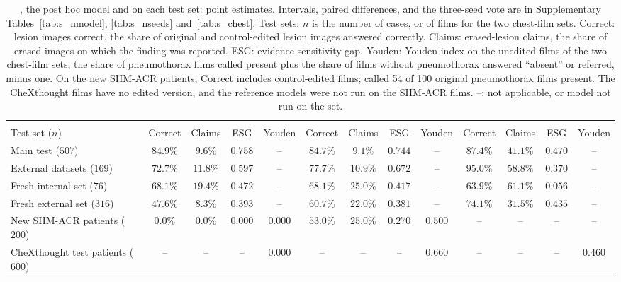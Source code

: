 \begin{table}[!t]
\caption{\ms{}, the post hoc model \msn{} and \gem{} on each test set: point estimates. Intervals, paired differences, \msp{} and the three-seed vote are in Supplementary Tables~\ref{tab:s_nmodel}, \ref{tab:s_nseeds} and~\ref{tab:s_chest}. Test sets: $n$ is the number of cases, or of films for the two chest-film sets. Correct: lesion images correct, the share of original and control-edited lesion images answered correctly. Claims: erased-lesion claims, the share of erased images on which the finding was reported. ESG: evidence sensitivity gap. Youden: Youden index on the unedited films of the two chest-film sets, the share of pneumothorax films called present plus the share of films without pneumothorax answered ``absent'' or referred, minus one. On the new SIIM-ACR patients, Correct includes control-edited films; \msn{} called 54 of 100 original pneumothorax films present. The CheXthought films have no edited version, and the reference models were not run on the SIIM-ACR films. --: not applicable, or model not run on the set.}
\label{tab:nmodel}
\centering
\footnotesize
\setlength{\tabcolsep}{3.5pt}
\begin{adjustbox}{max width=\textwidth}
\begin{tabular}{l cccc cccc cccc}
\toprule
 & \multicolumn{4}{c}{\ms{}} & \multicolumn{4}{c}{\msn{}} & \multicolumn{4}{c}{\gem{}} \\
\cmidrule(lr){2-5}\cmidrule(lr){6-9}\cmidrule(lr){10-13}
Test set ($n$) & Correct & Claims & ESG & Youden & Correct & Claims & ESG & Youden & Correct & Claims & ESG & Youden \\
\midrule
Main test ($507$) & $84.9\%$ & $9.6\%$ & $0.758$ & -- & $84.7\%$ & $9.1\%$ & $0.744$ & -- & $87.4\%$ & $41.1\%$ & $0.470$ & -- \\
External datasets ($169$) & $72.7\%$ & $11.8\%$ & $0.597$ & -- & $77.7\%$ & $10.9\%$ & $0.672$ & -- & $95.0\%$ & $58.8\%$ & $0.370$ & -- \\
Fresh internal set ($76$) & $68.1\%$ & $19.4\%$ & $0.472$ & -- & $68.1\%$ & $25.0\%$ & $0.417$ & -- & $63.9\%$ & $61.1\%$ & $0.056$ & -- \\
Fresh external set ($316$) & $47.6\%$ & $8.3\%$ & $0.393$ & -- & $60.7\%$ & $22.0\%$ & $0.381$ & -- & $74.1\%$ & $31.5\%$ & $0.435$ & -- \\
New SIIM-ACR patients ($200$) & $0.0\%$ & $0.0\%$ & $0.000$ & $0.000$ & $53.0\%$ & $25.0\%$ & $0.270$ & $0.500$ & -- & -- & -- & -- \\
CheXthought test patients ($600$) & -- & -- & -- & $0.000$ & -- & -- & -- & $0.660$ & -- & -- & -- & $0.460$ \\
\bottomrule
\end{tabular}
\end{adjustbox}
\end{table}
